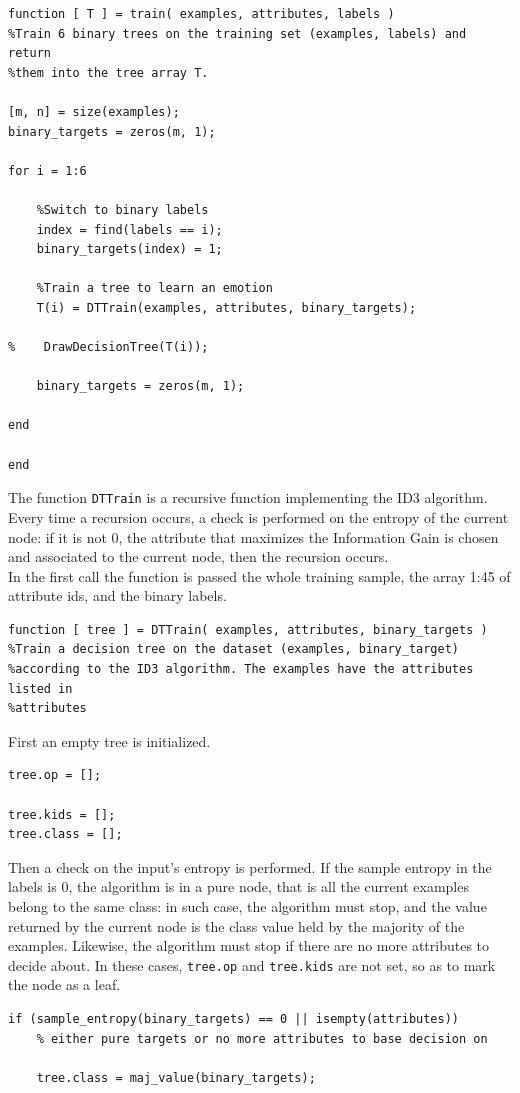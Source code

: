 \documentclass{article}
\begin{document}
\begin{lstlisting}
function [ T ] = train( examples, attributes, labels )
%Train 6 binary trees on the training set (examples, labels) and return
%them into the tree array T.

[m, n] = size(examples); 
binary_targets = zeros(m, 1);

for i = 1:6
   
    %Switch to binary labels
    index = find(labels == i);
    binary_targets(index) = 1;
    
    %Train a tree to learn an emotion
    T(i) = DTTrain(examples, attributes, binary_targets);
    
%    DrawDecisionTree(T(i));
    
    binary_targets = zeros(m, 1);
    
end

end
\end{lstlisting}
The function \verb$DTTrain$ is a recursive function implementing the ID3 algorithm. Every time a recursion occurs, a check is performed on the entropy of the current node: if it is not 0, the attribute that maximizes the Information Gain is chosen and associated to the current node, then the recursion occurs.\\
In the first call the function is passed the whole training sample, the array 1:45 of attribute ids, and the binary labels.
\begin{lstlisting}
function [ tree ] = DTTrain( examples, attributes, binary_targets )
%Train a decision tree on the dataset (examples, binary_target)
%according to the ID3 algorithm. The examples have the attributes listed in
%attributes
\end{lstlisting}
First an empty tree is initialized.
\begin{lstlisting}[firstnumber=6]
%Initialize an empty tree
tree.op = [];

tree.kids = [];
tree.class = [];
\end{lstlisting}
Then a check on the input's entropy is performed. If the sample entropy in the labels is 0, the algorithm is in a pure node, that is all the current examples belong to the same class: in such case, the algorithm must stop, and the value returned by the current node is the class value held by the majority of the examples. Likewise, the algorithm must stop if there are no more attributes to decide about. In these cases, \verb$tree.op$ and \verb$tree.kids$ are not set, so as to mark the node as a leaf.
\begin{lstlisting}[firstnumber=12]
if (sample_entropy(binary_targets) == 0 || isempty(attributes))   
    % either pure targets or no more attributes to base decision on
    
    tree.class = maj_value(binary_targets);
\end{lstlisting}
\end{document}
